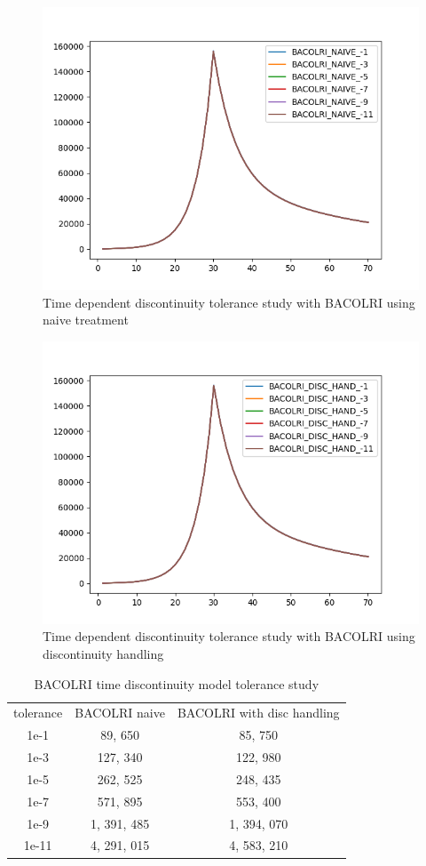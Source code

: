 \documentclass{article}
\begin{document}
\begin{figure}[H]
\centering
\includegraphics[width=0.7\linewidth]{./figures/pde_time_disc_bacolri_naive_tol}
\caption{Time dependent discontinuity tolerance study with BACOLRI using naive treatment}
\label{fig:pde_time_disc_bacolri_naive_tol}
\end{figure}

\begin{figure}[H]
\centering
\includegraphics[width=0.7\linewidth]{./figures/pde_time_disc_bacolri_disc_hand_tol}
\caption{Time dependent discontinuity tolerance study with BACOLRI using discontinuity handling}
\label{fig:pde_time_disc_bacolri_disc_hand_tol}
\end{figure}

\begin{table}[h]
\caption {BACOLRI time discontinuity model tolerance study} 
\label{tab:BACOLRI_time_tolerance}
\begin{center}
\begin{tabular}{ c c c } 
tolerance  & BACOLRI naive & BACOLRI with disc handling\\ 
1e-1       & 89, 650        &   85, 750     \\
1e-3       & 127, 340       &   122, 980   \\
1e-5       & 262, 525       &   248, 435    \\
1e-7       & 571, 895       &   553, 400    \\
1e-9       & 1, 391, 485     &   1, 394, 070    \\
1e-11      & 4, 291, 015     &   4, 583, 210   \\
\end{tabular}
\end{center}
\end{table}
\end{document}
